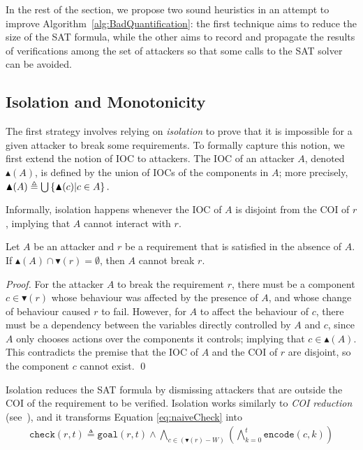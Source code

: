 {In the rest of the section, we propose two sound heuristics in an attempt to improve Algorithm~\ref{alg:BadQuantification}: the first technique aims to reduce the size of the SAT formula, while the other aims to record and propagate the results of verifications among the set of attackers so that some calls to the SAT solver can be avoided.

\subsection{Isolation and Monotonicity}
The first strategy involves relying on \emph{isolation} to prove that it is impossible for a given attacker to break some requirements. To formally capture this notion, we first extend the notion of IOC to attackers. The IOC of an attacker $A$, denoted $\blacktriangle(A)$, is defined by the union of IOCs of the components in $A$; more precisely, $\blacktriangle(A) \triangleq \bigcup\left\{\blacktriangle(c)|c \in A\right\}.$

Informally, isolation happens whenever the IOC of $A$ is disjoint from the COI of $r$, implying that $A$ cannot interact with $r$.
\begin{proposition}[Isolation]
\label{theo:isolation}
Let $A$ be an attacker and $r$ be a requirement that is satisfied in the absence of $A$. If $\blacktriangle(A)\cap \blacktriangledown(r)=\emptyset$, then $A$ cannot break $r$.\end{proposition}
\begin{proof}

For the attacker $A$ to break the requirement $r$, there must be a component $c \in \blacktriangledown(r)$ whose behaviour was affected by the presence of $A$, and whose change of behaviour caused $r$ to fail. However, for $A$ to affect the behaviour of $c$, there must be a dependency between the variables directly controlled by $A$ and $c$, since $A$ only chooses actions over the components it controls; implying that $c\in \blacktriangle(A)$. This contradicts the premise that the IOC of $A$ and the COI of $r$ are disjoint, so the component $c$ cannot exist. \qed
\end{proof}
Isolation reduces the SAT formula by dismissing attackers that are outside the COI of the requirement to be verified. Isolation works similarly to \emph{COI reduction} (see~\cite{ToSplitOrToGroup,GraphLabelingForEfficientCOIComputation,HandbookOfSatisfiability,HandbookOfModelChecking,OptimizedModelCheckingOfMultipleProperties}), and it transforms Equation \ref{eq:naiveCheck} into
\begin{align}
\label{eq:isolation}
\mathtt{check}(r,t)\triangleq\mathtt{goal}(r,t)\land\! \bigwedge_{c\in (\blacktriangledown(r)- W)}\left( \bigwedge_{k=0}^{t}{\mathtt{encode}(c,k)}\right)
\end{align}

}
